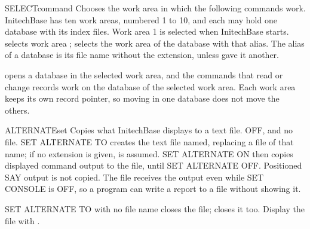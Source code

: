 \begin{XbaseEntry}{SELECT}{command}
Chooses the work area in which the following commands work.
\Syntax
{}
\Usage
InitechBase has ten work areas, numbered 1 to 10, and each may hold one
database with its index files.  Work area 1 is selected when InitechBase
starts.    selects work area ;  
selects the work area of the database with that alias.  The alias of a
database is its file name without the extension, unless  gave it
another.

 opens a database in the selected work area, and the commands that
read or change records work on the database of the selected work area.  Each
work area keeps its own record pointer, so moving in one database does not
move the others.
\Examples
{}
\end{XbaseEntry}

\begin{XbaseEntry}{ALTERNATE}{set}
Copies what InitechBase displays to a text file.
\Syntax
{}
\Defaults
OFF, and no file.
\Usage
SET ALTERNATE TO creates the text file named, replacing a file of that name;
if no extension is given,  is assumed.  SET ALTERNATE ON then
copies displayed command output to the file, until SET ALTERNATE OFF.
Positioned  SAY output is not copied.
The file receives the output even while SET CONSOLE is OFF, so a program can
write a report to a file without showing it.

SET ALTERNATE TO with no file name closes the file;  closes it
too.  Display the file with .
\end{XbaseEntry}

